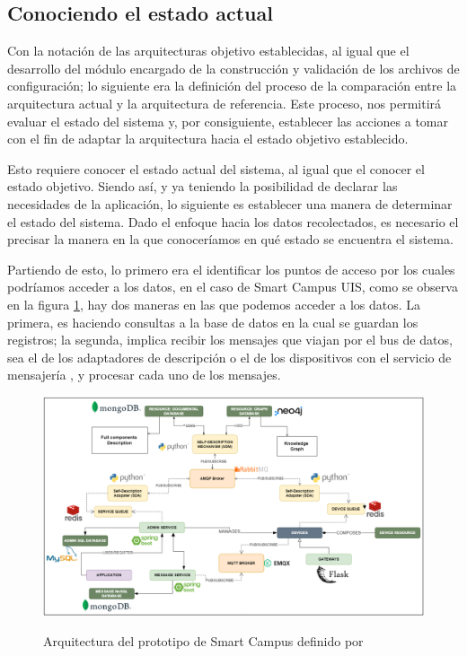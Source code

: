 \subsection{Conociendo el estado actual}

Con la notación de las arquitecturas objetivo establecidas, al igual que el desarrollo del módulo encargado de la construcción y validación de los archivos de configuración; lo siguiente era la definición del proceso de la comparación entre la arquitectura actual y la arquitectura de referencia. Este proceso, nos permitirá evaluar el estado del sistema y, por consiguiente, establecer las acciones a tomar con el fin de adaptar la arquitectura hacia el estado objetivo establecido.

Esto requiere conocer el estado actual del sistema, al igual que el conocer el estado objetivo. Siendo así, y ya teniendo la posibilidad de declarar las necesidades de la aplicación, lo siguiente es establecer una manera de determinar el estado del sistema. Dado el enfoque hacia los datos recolectados, es necesario el precisar la manera en la que conoceríamos en qué estado se encuentra el sistema.

Partiendo de esto, lo primero era el identificar los puntos de acceso por los cuales podríamos acceder a los datos, en el caso de Smart Campus UIS, como se observa en la figura \ref{fig:ArquitecturaSmartCampus}, hay dos maneras en las que podemos acceder a los datos. La primera, es haciendo consultas a la base de datos en la cual se guardan los registros; la segunda, implica recibir los mensajes que viajan por el bus de datos, sea el de los adaptadores de descripción o el de los dispositivos con el servicio de mensajería , y procesar cada uno de los mensajes.

\begin{figure}[ht]
    \centering
    \caption{Arquitectura del prototipo de Smart Campus definido por }
    \includegraphics[width=\linewidth]{images/ArquitecturaSmartCampus.png}
    \label{fig:ArquitecturaSmartCampus}
\end{figure}


